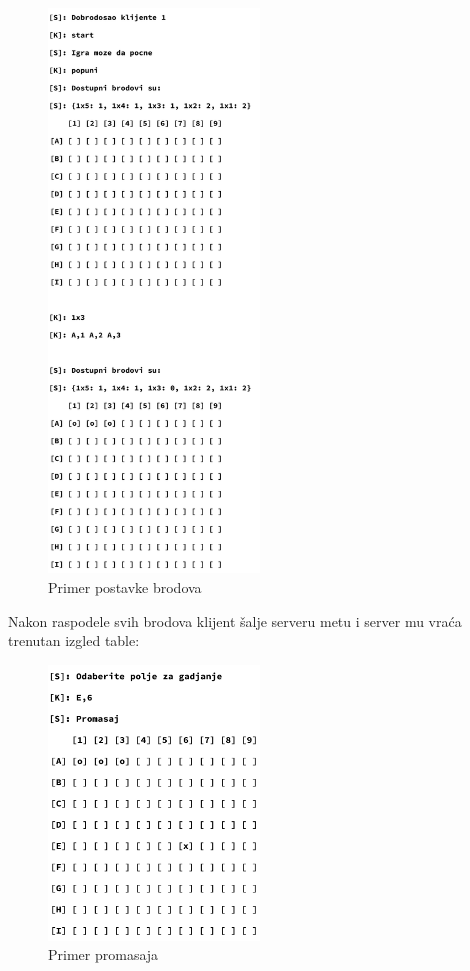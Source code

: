 \begin{figure}[H]
    \centering
    \includegraphics[width=0.5\textwidth]{Slike/PTP/PTP_Primer_komunikacije.png}
    \caption*{Primer postavke brodova}
    \label{fig:ptp_primer_postavke}
\end{figure}

Nakon raspodele svih brodova klijent šalje serveru metu i server mu vraća trenutan izgled table:

\begin{figure}[H]
    \centering
    \includegraphics[width=0.5\textwidth]{Slike/PTP/PTP_Promasaj.png}
    \caption*{Primer promasaja}
    \label{fig:ptp_promasaj}
\end{figure}

